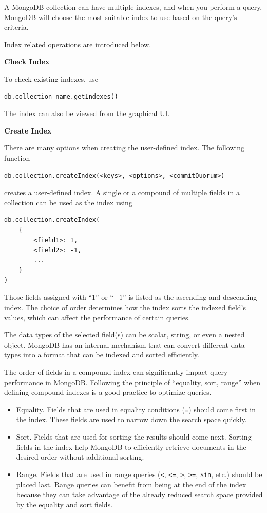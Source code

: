 A MongoDB collection can have multiple indexes, and when you perform a query, MongoDB will choose the most suitable index to use based on the query's criteria.

Index related operations are introduced below.

\vspace{0.1in}
\noindent \textbf{Check Index}
\vspace{0.1in}

To check existing indexes, use
\begin{lstlisting}
db.collection_name.getIndexes()
\end{lstlisting}
The index can also be viewed from the graphical UI.

\vspace{0.1in}
\noindent \textbf{Create Index}
\vspace{0.1in}

There are many options when creating the user-defined index. The following function 
\begin{lstlisting}
db.collection.createIndex(<keys>, <options>, <commitQuorum>)
\end{lstlisting}
creates a user-defined index. A single or a compound of multiple fields in a collection can be used as the index using
\begin{lstlisting}
db.collection.createIndex(
	{
		<field1>: 1,
		<field2>: -1,
		...
	}
)
\end{lstlisting}
Those fields assigned with ``$1$'' or ``$-1$'' is listed as the ascending and descending index. The choice of order determines how the index sorts the indexed field's values, which can affect the performance of certain queries.

The data types of the selected field(s) can be scalar, string, or even a nested object. MongoDB has an internal mechanism that can convert different data types into a format that can be indexed and sorted efficiently.

The order of fields in a compound index can significantly impact query performance in MongoDB. Following the principle of ``equality, sort, range'' when defining compound indexes is a good practice to optimize queries.

\begin{itemize}
	\item Equality. Fields that are used in equality conditions (\verb|=|) should come first in the index. These fields are used to narrow down the search space quickly.
	\item Sort. Fields that are used for sorting the results should come next. Sorting fields in the index help MongoDB to efficiently retrieve documents in the desired order without additional sorting.
	\item Range. Fields that are used in range queries (\verb|<|, \verb|<=|, \verb|>|, \verb|>=|, \verb|$in|, etc.) should be placed last. Range queries can benefit from being at the end of the index because they can take advantage of the already reduced search space provided by the equality and sort fields.
\end{itemize}


